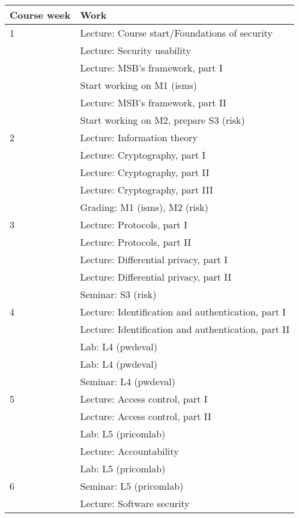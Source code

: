 \begin{table}
	\centering
  \begin{tabular}{lp{9cm}}
    \toprule
    \textbf{Course week}	& \textbf{Work} \\
    \midrule
    1
      & Lecture: Course start/Foundations of security\\
      & Lecture: Security usability\\
      & Lecture: MSB's framework, part I\\
      & Start working on M1 (isms)\\
      & Lecture: MSB's framework, part II\\
      & Start working on M2, prepare S3 (risk)\\
    \midrule
    2
      & Lecture: Information theory\\
      & Lecture: Cryptography, part I\\
      & Lecture: Cryptography, part II\\
      & Lecture: Cryptography, part III\\
      & Grading: M1 (isms), M2 (risk)\\
    \midrule
    3
      & Lecture: Protocols, part I\\
      & Lecture: Protocols, part II\\
      & Lecture: Differential privacy, part I\\
      & Lecture: Differential privacy, part II\\
      & Seminar: S3 (risk)\\
    \midrule
    4
      & Lecture: Identification and authentication, part I\\
      & Lecture: Identification and authentication, part II\\
      & Lab: L4 (pwdeval)\\
      & Lab: L4 (pwdeval)\\
      & Seminar: L4 (pwdeval)\\
    \midrule
    5
      & Lecture: Access control, part I\\
      & Lecture: Access control, part II\\
      & Lab: L5 (pricomlab)\\
      & Lecture: Accountability\\
      & Lab: L5 (pricomlab)\\
    \midrule
    6
      & Seminar: L5 (pricomlab)\\
      & Lecture: Software security\\

\end{tabular}
\end{table}
